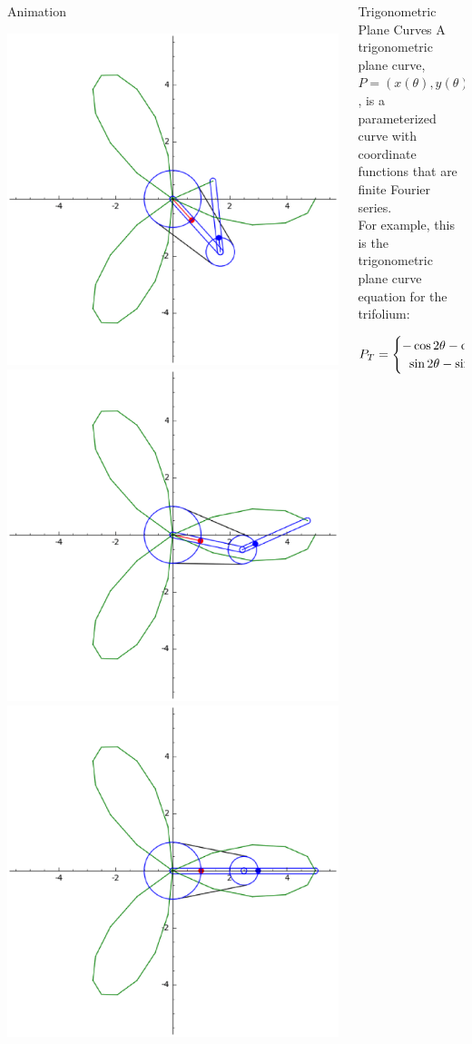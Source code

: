 \documentclass{beamer}
\begin{document}
\begin{frame}{}
\begin{columns}[t]
\begin{column}{0.245\linewidth}
\begin{block}{Animation}
\begin{center}
\includegraphics[width=0.3\columnwidth]{tri27.eps}
\includegraphics[width=0.3\columnwidth]{tri30.eps}
\includegraphics[width=0.3\columnwidth]{tri31.eps}\\[1em]


\end{center}

\end{block}
\end{column}%


\begin{column}{0.245\linewidth}

\begin{block}{Trigonometric Plane Curves}
A trigonometric plane curve, $P=(x(\theta),y(\theta))$, is a parameterized curve with coordinate functions that are finite Fourier series. \\

For example, this is the trigonometric plane curve equation for the trifolium:

\[
P_{T}=\begin{cases}
	\hfil -\cos{2\theta} - \cos{4\theta}\\
	\hfil \sin{2\theta} - \sin{4\theta}
	\end{cases}
\]


\end{block}
\end{column}
\end{columns}
\end{frame}
\end{document}
